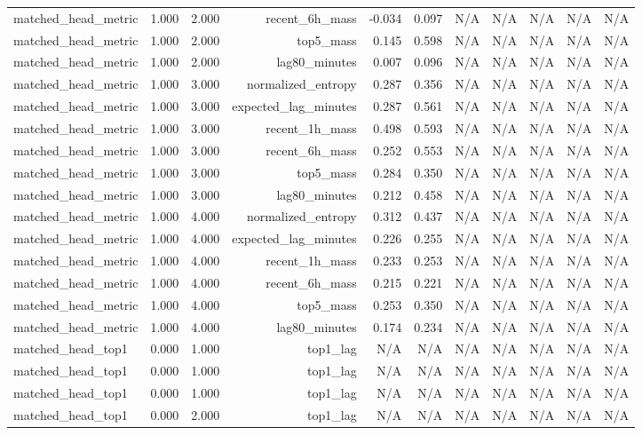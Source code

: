 \begin{table}[h!]
\begin{tabular}{lrrrrrrrrrr}
matched\_head\_metric & 1.000 & 2.000 & recent\_6h\_mass & -0.034 & 0.097 & N/A & N/A & N/A & N/A & N/A \\
matched\_head\_metric & 1.000 & 2.000 & top5\_mass & 0.145 & 0.598 & N/A & N/A & N/A & N/A & N/A \\
matched\_head\_metric & 1.000 & 2.000 & lag80\_minutes & 0.007 & 0.096 & N/A & N/A & N/A & N/A & N/A \\
matched\_head\_metric & 1.000 & 3.000 & normalized\_entropy & 0.287 & 0.356 & N/A & N/A & N/A & N/A & N/A \\
matched\_head\_metric & 1.000 & 3.000 & expected\_lag\_minutes & 0.287 & 0.561 & N/A & N/A & N/A & N/A & N/A \\
matched\_head\_metric & 1.000 & 3.000 & recent\_1h\_mass & 0.498 & 0.593 & N/A & N/A & N/A & N/A & N/A \\
matched\_head\_metric & 1.000 & 3.000 & recent\_6h\_mass & 0.252 & 0.553 & N/A & N/A & N/A & N/A & N/A \\
matched\_head\_metric & 1.000 & 3.000 & top5\_mass & 0.284 & 0.350 & N/A & N/A & N/A & N/A & N/A \\
matched\_head\_metric & 1.000 & 3.000 & lag80\_minutes & 0.212 & 0.458 & N/A & N/A & N/A & N/A & N/A \\
matched\_head\_metric & 1.000 & 4.000 & normalized\_entropy & 0.312 & 0.437 & N/A & N/A & N/A & N/A & N/A \\
matched\_head\_metric & 1.000 & 4.000 & expected\_lag\_minutes & 0.226 & 0.255 & N/A & N/A & N/A & N/A & N/A \\
matched\_head\_metric & 1.000 & 4.000 & recent\_1h\_mass & 0.233 & 0.253 & N/A & N/A & N/A & N/A & N/A \\
matched\_head\_metric & 1.000 & 4.000 & recent\_6h\_mass & 0.215 & 0.221 & N/A & N/A & N/A & N/A & N/A \\
matched\_head\_metric & 1.000 & 4.000 & top5\_mass & 0.253 & 0.350 & N/A & N/A & N/A & N/A & N/A \\
matched\_head\_metric & 1.000 & 4.000 & lag80\_minutes & 0.174 & 0.234 & N/A & N/A & N/A & N/A & N/A \\
matched\_head\_top1 & 0.000 & 1.000 & top1\_lag & N/A & N/A & N/A & N/A & N/A & N/A & N/A \\
matched\_head\_top1 & 0.000 & 1.000 & top1\_lag & N/A & N/A & N/A & N/A & N/A & N/A & N/A \\
matched\_head\_top1 & 0.000 & 1.000 & top1\_lag & N/A & N/A & N/A & N/A & N/A & N/A & N/A \\
matched\_head\_top1 & 0.000 & 2.000 & top1\_lag & N/A & N/A & N/A & N/A & N/A & N/A & N/A \\

\end{tabular}
\end{table}
